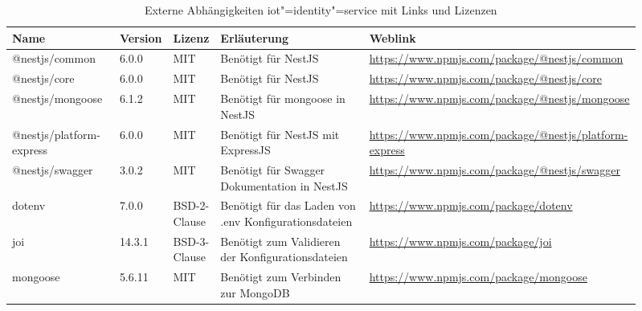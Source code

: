 \begin{landscape}
\begin{table}[htb]
	\caption{Externe Abhängigkeiten iot"=identity"=service mit Links und Lizenzen}
	\begin{tabular}{|p{0.18\linewidth}|p{0.06\linewidth}|p{0.06\linewidth}|p{0.28\linewidth}|p{0.33\linewidth}|}
		\hline
		Name & Version & Lizenz & Erläuterung & Weblink \\ \hline
		@nestjs/common & 6.0.0 & MIT & Benötigt für NestJS & \small\url{https://www.npmjs.com/package/@nestjs/common} \\ \hline
		@nestjs/core & 6.0.0 & MIT & Benötigt für NestJS & \small\url{https://www.npmjs.com/package/@nestjs/core} \\ \hline
		@nestjs/mongoose & 6.1.2 & MIT & Benötigt für mongoose in NestJS & \small\url{https://www.npmjs.com/package/@nestjs/mongoose} \\ \hline
		@nestjs/platform-express & 6.0.0 & MIT & Benötigt für NestJS mit ExpressJS & \small\url{https://www.npmjs.com/package/@nestjs/platform-express} \\ \hline
		@nestjs/swagger & 3.0.2 & MIT & Benötigt für Swagger Dokumentation in NestJS & \small\url{https://www.npmjs.com/package/@nestjs/swagger} \\ \hline
		dotenv & 7.0.0 & BSD-2-Clause & Benötigt für das Laden von .env Konfigurationsdateien & \small\url{https://www.npmjs.com/package/dotenv} \\ \hline
		joi & 14.3.1 & BSD-3-Clause & Benötigt zum Validieren der Konfigurationsdateien & \small\url{https://www.npmjs.com/package/joi} \\ \hline
		mongoose & 5.6.11 & MIT & Benötigt zum Verbinden zur MongoDB & \small\url{https://www.npmjs.com/package/mongoose} \\ \hline
	\end{tabular}
	\label{tbl:dependenciesIdentityService}
\end{table}


\end{landscape}
